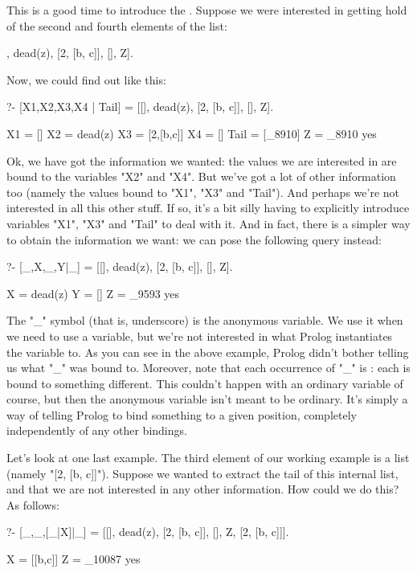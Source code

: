 This is a good time to introduce the .
Suppose we were interested in getting hold of the second and fourth
elements of the list:
\begin{LPNcodedisplay}
[[], dead(z), [2, [b, c]], [], Z].
\end{LPNcodedisplay}

Now, we could find out like this:
\begin{LPNcodedisplay}
?- [X1,X2,X3,X4 | Tail] =
            [[], dead(z), [2, [b, c]], [], Z].

X1 = []
X2 = dead(z)
X3 = [2,[b,c]]
X4 = []
Tail = [_8910]
Z = _8910
yes
\end{LPNcodedisplay}

Ok, we have got the information we wanted: the values we are
interested in are bound to the variables "X2" and "X4".  But
we've got a lot of other information too (namely the values bound to
"X1", "X3" and "Tail"). And perhaps we're not
interested in all this other stuff. If so, it's a bit silly having to
explicitly introduce variables "X1", "X3" and "Tail" to
deal with it.  And in fact, there is a simpler way to obtain 
the information we want: we can pose the following query
instead:


\begin{LPNcodedisplay}
?- [_,X,_,Y|_] = [[], dead(z), [2, [b, c]], [], Z].

X = dead(z)
Y = []
Z = _9593
yes
\end{LPNcodedisplay}


The "\_" symbol (that is, underscore) is the anonymous variable.  We
use it when we need to use a variable, but we're not interested in
what Prolog instantiates the variable to.  As you can see in the above
example, Prolog didn't bother telling us what "\_" was bound to.
Moreover, note that each occurrence of "\_" is :
each is bound to something different. This couldn't happen with an
ordinary variable of course, but then the anonymous variable isn't
meant to be ordinary. It's simply a way of telling Prolog to bind
something to a given position, completely independently of any other
bindings.

Let's look at one last example. The third element of our working
example is a list (namely "[2, [b, c]]").  Suppose we
wanted to extract the tail of this internal list, and that we are not
interested in any other information.  How could we do this?  As
follows:

\begin{LPNcodedisplay}
?- [_,_,[_|X]|_] =
      [[], dead(z), [2, [b, c]], [], Z, [2, [b, c]]].

X = [[b,c]]
Z = _10087
yes
\end{LPNcodedisplay}




